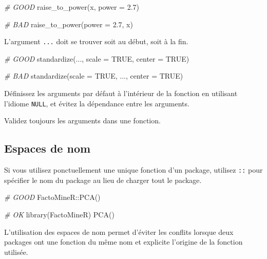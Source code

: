 \documentclass[
  french,
]{scrbook}
\newenvironment{Shaded}{\begin{snugshade}}{\end{snugshade}}
\newcommand{\AttributeTok}[1]{\textcolor[rgb]{0.77,0.63,0.00}{#1}}
\newcommand{\CommentTok}[1]{\textcolor[rgb]{0.56,0.35,0.01}{\textit{#1}}}
\newcommand{\ConstantTok}[1]{\textcolor[rgb]{0.00,0.00,0.00}{#1}}
\newcommand{\FloatTok}[1]{\textcolor[rgb]{0.00,0.00,0.81}{#1}}
\newcommand{\FunctionTok}[1]{\textcolor[rgb]{0.00,0.00,0.00}{#1}}
\newcommand{\NormalTok}[1]{#1}
\newcommand{\SpecialCharTok}[1]{\textcolor[rgb]{0.00,0.00,0.00}{#1}}
\begin{document}
\begin{Shaded}
\begin{Highlighting}[]
\CommentTok{\# GOOD}
\FunctionTok{raise\_to\_power}\NormalTok{(x, }\AttributeTok{power =} \FloatTok{2.7}\NormalTok{)}

\CommentTok{\# BAD}
\FunctionTok{raise\_to\_power}\NormalTok{(}\AttributeTok{power =} \FloatTok{2.7}\NormalTok{, x)}
\end{Highlighting}
\end{Shaded}

L'argument \texttt{...} doit se trouver soit au début, soit à la fin.

\begin{Shaded}
\begin{Highlighting}[]
\CommentTok{\# GOOD}
\FunctionTok{standardize}\NormalTok{(..., }\AttributeTok{scale =} \ConstantTok{TRUE}\NormalTok{, }\AttributeTok{center =} \ConstantTok{TRUE}\NormalTok{)}

\CommentTok{\# BAD}
\FunctionTok{standardize}\NormalTok{(}\AttributeTok{scale =} \ConstantTok{TRUE}\NormalTok{, ..., }\AttributeTok{center =} \ConstantTok{TRUE}\NormalTok{)}
\end{Highlighting}
\end{Shaded}

Définissez les arguments par défaut à l'intérieur de la fonction en utilisant l'idiome \texttt{NULL}, et évitez la dépendance entre les arguments.

Validez toujours les arguments dans une fonction.

\hypertarget{espaces-de-nom}{%
\subsection{Espaces de nom}\label{espaces-de-nom}}

Si vous utilisez ponctuellement une unique fonction d'un package, utilisez \texttt{::} pour spécifier le nom du package au lieu de charger tout le package.

\begin{Shaded}
\begin{Highlighting}[]
\CommentTok{\# GOOD}
\NormalTok{FactoMineR}\SpecialCharTok{::}\FunctionTok{PCA}\NormalTok{()}

\CommentTok{\# OK }
\FunctionTok{library}\NormalTok{(FactoMineR)}
\FunctionTok{PCA}\NormalTok{()}
\end{Highlighting}
\end{Shaded}

L'utilisation des espaces de nom permet d'éviter les conflits lorsque deux packages ont une fonction du même nom et explicite l'origine de la fonction utilisée.
\end{document}
